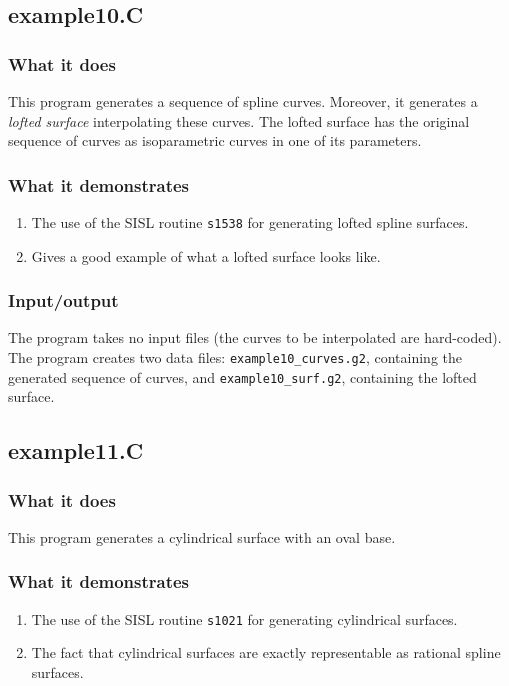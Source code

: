 \subsection{example10.C}

\subsubsection{What it does}
This program generates a sequence of spline curves.  Moreover, it generates a \emph{lofted
surface} interpolating these curves.  The lofted surface has the original sequence of curves
as isoparametric curves in one of its parameters.
\subsubsection{What it demonstrates}
\begin{enumerate}
\item The use of the SISL routine \verb/s1538/ for generating lofted spline surfaces.
\item Gives a good example of what a lofted surface looks like.
\end{enumerate}
\subsubsection{Input/output}
The program takes no input files (the curves to be interpolated are hard-coded).\\
The program creates two data files: \verb/example10_curves.g2/, containing the generated
sequence of curves, and \verb/example10_surf.g2/, containing the lofted surface.

\subsection{example11.C}

\subsubsection{What it does}
This program generates a cylindrical surface with an oval base.
\subsubsection{What it demonstrates}
\begin{enumerate}
\item The use of the SISL routine \verb/s1021/ for generating cylindrical surfaces.
\item The fact that cylindrical surfaces are exactly representable as rational spline surfaces.
\end{enumerate}
